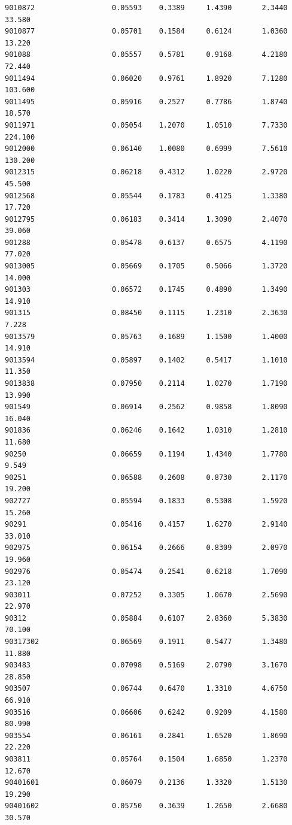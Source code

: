\documentclass[
  letterpaper,
  DIV=11,
  numbers=noendperiod]{scrartcl}
\begin{document}
\begin{verbatim}
9010872                  0.05593    0.3389     1.4390       2.3440  33.580
9010877                  0.05701    0.1584     0.6124       1.0360  13.220
901088                   0.05557    0.5781     0.9168       4.2180  72.440
9011494                  0.06020    0.9761     1.8920       7.1280 103.600
9011495                  0.05916    0.2527     0.7786       1.8740  18.570
9011971                  0.05054    1.2070     1.0510       7.7330 224.100
9012000                  0.06140    1.0080     0.6999       7.5610 130.200
9012315                  0.06218    0.4312     1.0220       2.9720  45.500
9012568                  0.05544    0.1783     0.4125       1.3380  17.720
9012795                  0.06183    0.3414     1.3090       2.4070  39.060
901288                   0.05478    0.6137     0.6575       4.1190  77.020
9013005                  0.05669    0.1705     0.5066       1.3720  14.000
901303                   0.06572    0.1745     0.4890       1.3490  14.910
901315                   0.08450    0.1115     1.2310       2.3630   7.228
9013579                  0.05763    0.1689     1.1500       1.4000  14.910
9013594                  0.05897    0.1402     0.5417       1.1010  11.350
9013838                  0.07950    0.2114     1.0270       1.7190  13.990
901549                   0.06914    0.2562     0.9858       1.8090  16.040
901836                   0.06246    0.1642     1.0310       1.2810  11.680
90250                    0.06659    0.1194     1.4340       1.7780   9.549
90251                    0.06588    0.2608     0.8730       2.1170  19.200
902727                   0.05594    0.1833     0.5308       1.5920  15.260
90291                    0.05416    0.4157     1.6270       2.9140  33.010
902975                   0.06154    0.2666     0.8309       2.0970  19.960
902976                   0.05474    0.2541     0.6218       1.7090  23.120
903011                   0.07252    0.3305     1.0670       2.5690  22.970
90312                    0.05884    0.6107     2.8360       5.3830  70.100
90317302                 0.06569    0.1911     0.5477       1.3480  11.880
903483                   0.07098    0.5169     2.0790       3.1670  28.850
903507                   0.06744    0.6470     1.3310       4.6750  66.910
903516                   0.06606    0.6242     0.9209       4.1580  80.990
903554                   0.06161    0.2841     1.6520       1.8690  22.220
903811                   0.05764    0.1504     1.6850       1.2370  12.670
90401601                 0.06079    0.2136     1.3320       1.5130  19.290
90401602                 0.05750    0.3639     1.2650       2.6680  30.570

\end{verbatim}
\end{document}
